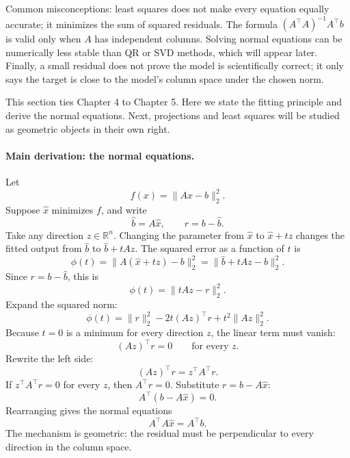 Common misconceptions: least squares does not make every equation equally accurate; it minimizes the sum of squared residuals. The formula \((A^\top A)^{-1}A^\top b\) is valid only when \(A\) has independent columns. Solving normal equations can be numerically less stable than QR or SVD methods, which will appear later. Finally, a small residual does not prove the model is scientifically correct; it only says the target is close to the model's column space under the chosen norm.

This section ties Chapter 4 to Chapter 5. Here we state the fitting principle and derive the normal equations. Next, projections and least squares will be studied as geometric objects in their own right.

\paragraph{Main derivation: the normal equations.}
Let
\[
f(x)=\|Ax-b\|_2^2.
\]
Suppose \(\hat x\) minimizes \(f\), and write
\[
\hat b=A\hat x,
\qquad
r=b-\hat b.
\]
Take any direction \(z\in\mathbb{R}^n\). Changing the parameter from \(\hat x\) to \(\hat x+tz\) changes the fitted output from \(\hat b\) to \(\hat b+tAz\). The squared error as a function of \(t\) is
\[
\phi(t)=\|A(\hat x+tz)-b\|_2^2
=\|\hat b+tAz-b\|_2^2.
\]
Since \(r=b-\hat b\), this is
\[
\phi(t)=\|tAz-r\|_2^2.
\]
Expand the squared norm:
\[
\phi(t)=\|r\|_2^2-2t(Az)^\top r+t^2\|Az\|_2^2.
\]
Because \(t=0\) is a minimum for every direction \(z\), the linear term must vanish:
\[
(Az)^\top r=0
\qquad\text{for every }z.
\]
Rewrite the left side:
\[
(Az)^\top r=z^\top A^\top r.
\]
If \(z^\top A^\top r=0\) for every \(z\), then \(A^\top r=0\). Substitute \(r=b-A\hat x\):
\[
A^\top(b-A\hat x)=0.
\]
Rearranging gives the normal equations
\[
A^\top A\hat x=A^\top b.
\]
The mechanism is geometric: the residual must be perpendicular to every direction in the column space.


